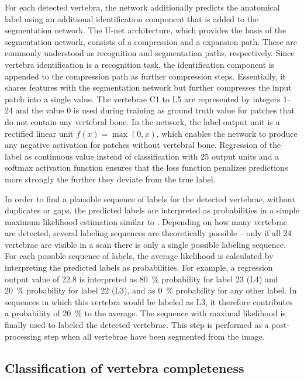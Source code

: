 \documentclass[authoryear,5p,final,times]{elsarticle}
\begin{document}
    For each detected vertebra, the network additionally predicts the anatomical label using an additional identification component that is added to the segmentation network. The U-net architecture, which provides the basis of the segmentation network, consists of a compression and a expansion path. These are commonly understood as recognition and segmentation paths, respectively. Since vertebra identification is a recognition task, the identification component is appended to the compression path as further compression steps. Essentially, it shares features with the segmentation network but further compresses the input patch into a single value. The vertebrae C1 to L5 are represented by integers \numrange{1}{24} and the value \num{0} is used during training as ground truth value for patches that do not contain any vertebral bone. In the network, the label output unit is a rectified linear unit $f(x) = \max \left( 0, x \right)$, which enables the network to produce any negative activation for patches without vertebral bone. Regression of the label as continuous value instead of classification with \num{25} output units and a softmax activation function ensures that the loss function penalizes predictions more strongly the further they deviate from the true label.

    In order to find a plausible sequence of labels for the detected vertebrae, without duplicates or gaps, the predicted labels are interpreted as probabilities in a simple maximum likelihood estimation similar to \citet{Klinder2009}. Depending on how many vertebrae are detected, several labeling sequences are theoretically possible -- only if all \num{24} vertebrae are visible in a scan there is only a single possible labeling sequence. For each possible sequence of labels, the average likelihood is calculated by interpreting the predicted labels as probabilities. For example, a regression output value of \num{22.8} is interpreted as \SI{80}{\percent} probability for label \num{23} (L4) and \SI{20}{\percent} probability for label \num{22} (L3), and as \SI{0}{\percent} probability for any other label. In sequences in which this vertebra would be labeled as L3, it therefore contributes a probability of \SI{20}{\percent} to the average. The sequence with maximal likelihood is finally used to labeled the detected vertebrae. This step is performed as a post-processing step when all vertebrae have been segmented from the image.

    \subsection{Classification of vertebra completeness}
    \label{sec:method_completeness}
\end{document}
